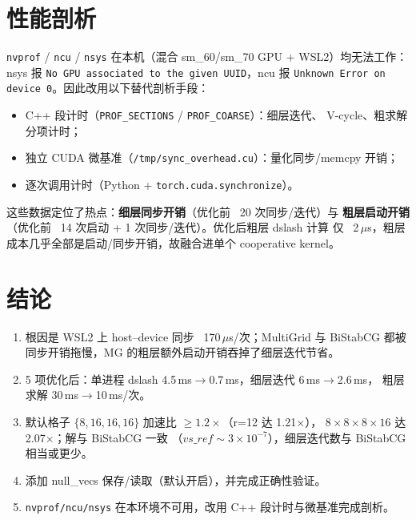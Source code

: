 \documentclass[11pt,a4paper]{article}
\begin{document}
\section{性能剖析}
\label{sec:profile}

\texttt{nvprof} / \texttt{ncu} / \texttt{nsys} 在本机（混合 sm\_60/sm\_70 GPU +
WSL2）均无法工作：nsys 报 \texttt{No GPU associated to the given UUID}，ncu 报
\texttt{Unknown Error on device 0}。因此改用以下替代剖析手段：
\begin{itemize}
  \item C++ 段计时（\texttt{PROF\_SECTIONS} / \texttt{PROF\_COARSE}）：细层迭代、
        V-cycle、粗求解分项计时；
  \item 独立 CUDA 微基准（\texttt{/tmp/sync\_overhead.cu}）：量化同步/memcpy 开销；
  \item 逐次调用计时（Python + \texttt{torch.cuda.synchronize}）。
\end{itemize}
这些数据定位了热点：\textbf{细层同步开销}（优化前 ~20 次同步/迭代）与
\textbf{粗层启动开销}（优化前 ~14 次启动 + 1 次同步/迭代）。优化后粗层 dslash 计算
仅 ~2\,$\mu$s，粗层成本几乎全部是启动/同步开销，故融合进单个 cooperative kernel。

\section{结论}
\label{sec:conclusion}

\begin{enumerate}
  \item 根因是 WSL2 上 host--device 同步 ~170\,$\mu$s/次；MultiGrid 与 BiStabCG
        都被同步开销拖慢，MG 的粗层额外启动开销吞掉了细层迭代节省。
  \item 5 项优化后：单进程 dslash 4.5\,ms$\to$0.7\,ms，细层迭代 6\,ms$\to$2.6\,ms，
        粗层求解 30\,ms$\to$10\,ms/次。
  \item 默认格子 $\{8,16,16,16\}$ 加速比 $\ge 1.2\times$（r=12 达 1.21$\times$），
        $8\times8\times8\times16$ 达 2.07$\times$；解与 BiStabCG 一致
        （$vs\_ref\sim3\times10^{-7}$），细层迭代数与 BiStabCG 相当或更少。
  \item 添加 null\_vecs 保存/读取（默认开启），并完成正确性验证。
  \item \texttt{nvprof/ncu/nsys} 在本环境不可用，改用 C++ 段计时与微基准完成剖析。
\end{enumerate}
\end{document}
